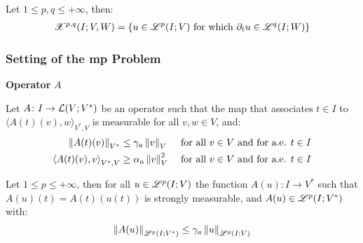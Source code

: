 \begin{frame}
\begin{center}
        \begin{minipage}{0.75\textwidth}
            \begin{definition}
                Let $1 \leq p, q \leq +\infty$, then:
                \begin{align*}
                    \mathscr{X}^{p, q}(I; V, W) = \left\{ u \in \mathscr{L}^{p}(I; V) \text{ for which } \partial_t u \in \mathscr{L}^{q}(I; W) \right\}
                \end{align*}
            \end{definition}
        \end{minipage}
    \end{center}
    \vspace*{\fill}
    
\end{frame}

\begin{frame}
    \frametitle{Setting of the \acrfull{mp} Problem}

    \vspace*{\fill}
    \begin{center}
        {\color{\accentcolor} \Large \textbf{Operator} $A$}
        \vspace*{0.25cm}

        \begin{minipage}{0.75\textwidth}
            \begin{definition}
                Let $A \colon I \rightarrow \mathcal{L}(V;V^*)$ be an operator such that the map that associates $t \in I$ to $\langle A(t)(v), w \rangle_{V^*, V}$ is measurable for all $v, w \in V$, and:
                \begin{align*}
                    \left\lVert A(t)(v) \right\rVert_{V^*} & \leq \gamma_{a} \left\lVert v \right\rVert_V &\text{ for all } v \in V \text{ and for a.e. } t \in I \\
                    \left\langle A(t)(v), v \right\rangle_{V^*, V} & \geq \alpha_{a} \left\lVert v \right\rVert_V^2 &\text{ for all } v \in V \text{ and for a.e. } t \in I
                \end{align*}
            \end{definition}

            \begin{lemma}
                Let $1 \leq p \leq +\infty$, then for all $u \in \mathscr{L}^{p}(I; V)$ the function $A(u) \colon I \rightarrow V^*$ such that $A(u)(t) = A(t)(u(t))$ is strongly measurable, and $A(u) \in \mathscr{L}^{p}(I; V^*)$ with:
                \begin{align*}
                    \left\lVert A(u) \right\rVert_{\mathscr{L}^{p}(I; V^*)} \leq \gamma_{a} \left\lVert u \right\rVert_{\mathscr{L}^{p}(I; V)}
                \end{align*}
            \end{lemma}
        \end{minipage}
    \end{center}
    \vspace*{\fill}
    
\end{frame}

